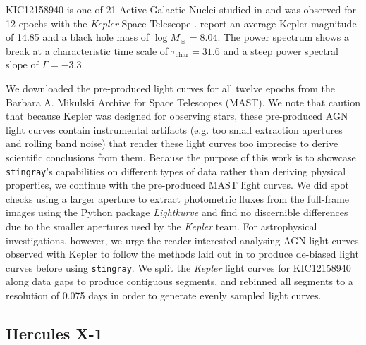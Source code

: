 \documentclass[twocolumn]{aastex62}
\newcommand{\stingray}{\texttt{stingray}\xspace}
\begin{document}
KIC12158940 is one of 21 Active Galactic Nuclei studied in \citet{smith2018} and was observed for 12 epochs with the \textit{Kepler} Space Telescope \citep{borucki2010}. \citet{smith2018} report an average Kepler magnitude of 14.85 \citep[originally calculated in][]{brown2011} and a black hole mass of $\log{M_{\sun} }= 8.04$. The power spectrum shows a break at a characteristic time scale of $\tau_\mathrm{char} = 31.6$ and a steep power spectral slope of $\Gamma = -3.3$.

We downloaded the pre-produced light curves for all twelve epochs from the Barbara A. Mikulski Archive for Space Telescopes (MAST). We note that \citet{smith2018} caution that because Kepler was designed for observing stars, these pre-produced AGN light curves contain instrumental artifacts (e.g. too small extraction apertures and rolling band noise) that render these light curves too imprecise to derive scientific conclusions from them. Because the purpose of this work is to showcase \stingray's capabilities on different types of data rather than deriving physical properties, we continue with the pre-produced MAST light curves. We did spot checks using a larger aperture to extract photometric fluxes from the full-frame images using the Python package \textit{Lightkurve} \citep{lightkurve} and find no discernible differences due to the smaller apertures used by the \textit{Kepler} team. 
For astrophysical investigations, however, we urge the reader interested analysing AGN light curves observed with Kepler to follow the methods laid out in \citet{smith2018} to produce de-biased light curves before using \stingray. We split the \textit{Kepler} light curves for KIC12158940 along data gaps to produce contiguous segments, and rebinned all segments to a resolution of 0.075 days in order to generate evenly sampled light curves. 

\subsection{Hercules X-1}
\label{sec:herx1}
\end{document}
